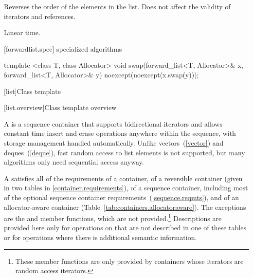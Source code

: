 \begin{itemdescr}
\pnum
\effects Reverses the order of the elements in the list.
Does not affect the validity of iterators and references.

\pnum
\complexity Linear time.
\end{itemdescr}

[forwardlist.spec]{ specialized algorithms}

%
%
\begin{itemdecl}
template <class T, class Allocator>
  void swap(forward_list<T, Allocator>& x, forward_list<T, Allocator>& y)
    noexcept(noexcept(x.swap(y)));
\end{itemdecl}

\begin{itemdescr}
\pnum
\effects {}
\end{itemdescr}

[list]{Class template }

[list.overview]{Class template  overview}

\pnum
{}%
A
is a sequence container that supports
bidirectional iterators and allows constant time insert and erase
operations anywhere within the sequence, with storage management handled
automatically. Unlike vectors~(\ref{vector}) and deques~(\ref{deque}),
fast random access to list elements is not supported, but many
algorithms only need sequential access anyway.

\pnum
A  satisfies all of the requirements of a container, of
a reversible container (given in two tables in
\ref{container.requirements}), of a sequence container,
including most of the optional sequence container
requirements~(\ref{sequence.reqmts}), and of an allocator-aware container
(Table~\ref{tab:containers.allocatoraware}).
The exceptions are the
and
member functions, which are not provided.\footnote{These member functions
are only provided by containers whose iterators
are random access iterators.
}
Descriptions are provided here only for operations on
that are not described in one of these tables
or for operations where there is additional semantic information.


